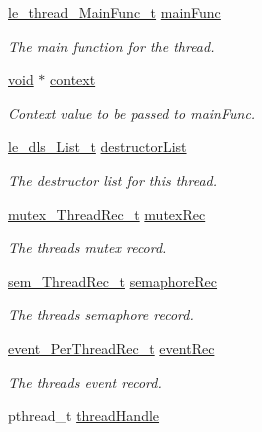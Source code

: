 \begin{DoxyCompactItemize}
\hyperlink{le__thread_8h_a9210663fea7283e32a6e988ebcf75126}{le\+\_\+thread\+\_\+\+Main\+Func\+\_\+t} \hyperlink{structthread___obj__t_a5a1111c537829992f6dd41e050d23346}{main\+Func}
\begin{DoxyCompactList}\small\item\em The main function for the thread. \end{DoxyCompactList}\item 
\hyperlink{_t_e_m_p_l_a_t_e__cdef_8h_ac9c84fa68bbad002983e35ce3663c686}{void} $\ast$ \hyperlink{structthread___obj__t_a869152fd4ea3fbad33d5436f2d7f337f}{context}
\begin{DoxyCompactList}\small\item\em Context value to be passed to main\+Func. \end{DoxyCompactList}\item 
\hyperlink{structle__dls___list__t}{le\+\_\+dls\+\_\+\+List\+\_\+t} \hyperlink{structthread___obj__t_aba2bf90f94c8204f7c1a75eddd74126b}{destructor\+List}
\begin{DoxyCompactList}\small\item\em The destructor list for this thread. \end{DoxyCompactList}\item 
\hyperlink{structmutex___thread_rec__t}{mutex\+\_\+\+Thread\+Rec\+\_\+t} \hyperlink{structthread___obj__t_a312844fab77f87e62e6ed01cb03af0f2}{mutex\+Rec}
\begin{DoxyCompactList}\small\item\em The thread\textquotesingle{}s mutex record. \end{DoxyCompactList}\item 
\hyperlink{structsem___thread_rec__t}{sem\+\_\+\+Thread\+Rec\+\_\+t} \hyperlink{structthread___obj__t_a1eaf06f2bc7a29a871fc71a541051e3c}{semaphore\+Rec}
\begin{DoxyCompactList}\small\item\em The thread\textquotesingle{}s semaphore record. \end{DoxyCompactList}\item 
\hyperlink{structevent___per_thread_rec__t}{event\+\_\+\+Per\+Thread\+Rec\+\_\+t} \hyperlink{structthread___obj__t_a41732035120c5783abedcf29e5aa8e08}{event\+Rec}
\begin{DoxyCompactList}\small\item\em The thread\textquotesingle{}s event record. \end{DoxyCompactList}\item 
pthread\+\_\+t \hyperlink{structthread___obj__t_a813ff532b3b455d01711ae9310efcd8b}{thread\+Handle}

\end{DoxyCompactItemize}
